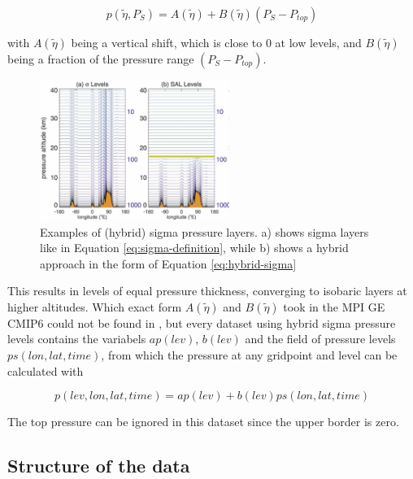 \begin{equation}
\label{eq:hybrid-sigma}
p(\tilde{\eta}, P_S) = A(\tilde{\eta}) + B(\tilde{\eta}) (P_S - P_{top})
\end{equation}


with $A(\tilde{\eta})$ being a vertical shift, which is close to 0 at low levels, and $B(\tilde{\eta})$ being a fraction of the pressure range $(P_S - P_{top})$. 

\begin{figure}
  \begin{center}
    \includegraphics[width=0.55\textwidth]{figures/hybrid_sigma_pressure_layers.png}
  \end{center}
  \caption{Examples of (hybrid) sigma pressure layers. a) shows sigma layers like in Equation \ref{eq:sigma-definition}, while b) shows a hybrid approach in the form of Equation \ref{eq:hybrid-sigma} \cite{eckermann_hybrid_2009}}\label{fig:hybrid-sigma}
\end{figure}



This results in levels of equal pressure thickness, converging to isobaric layers at higher altitudes. 
Which exact form $A(\tilde{\eta})$ and $B(\tilde{\eta})$ took in the MPI GE CMIP6 could not be found in \cite{olonscheck_new_2023}, but every dataset using hybrid sigma pressure levels contains the variabels $ap(lev)$, $b(lev)$ and the field of pressure levels $ps(lon, lat, time)$, from which the pressure at any gridpoint and level can be calculated with 

\begin{equation}
\label{eq:mpige-sigma-hybrid-pressure}
p(lev, lon, lat, time) = ap(lev) + b(lev) ps(lon, lat, time)
\end{equation}


The top pressure can be ignored in this dataset since the upper border is zero.


\subsection{Structure of the data}

